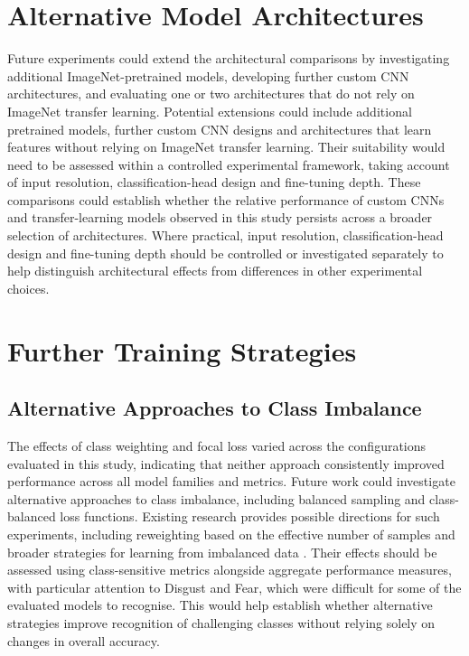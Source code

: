 \documentclass[12pt, a4paper]{report}
\let\oldsection\section
\renewcommand{\section}{%
    \Needspace{6\baselineskip}%
    \oldsection
}
\let\oldsubsection\subsection
\renewcommand{\subsection}{%
    \Needspace{6\baselineskip}%
    \oldsubsection
}
\begin{document}
		\section{Alternative Model Architectures}
			
			Future experiments could extend the architectural comparisons by investigating additional ImageNet-pretrained models, developing further custom CNN architectures, and evaluating one or two architectures that do not rely on ImageNet transfer learning. Potential extensions could include additional pretrained models, further custom CNN designs and architectures that learn features without relying on ImageNet transfer learning. Their suitability would need to be assessed within a controlled experimental framework, taking account of input resolution, classification-head design and fine-tuning depth. These comparisons could establish whether the relative performance of custom CNNs and transfer-learning models observed in this study persists across a broader selection of architectures. Where practical, input resolution, classification-head design and fine-tuning depth should be controlled or investigated separately to help distinguish architectural effects from differences in other experimental choices.
			
		\section{Further Training Strategies}
			
			\subsection{Alternative Approaches to Class Imbalance}
				
				The effects of class weighting and focal loss varied across the configurations evaluated in this study, indicating that neither approach consistently improved performance across all model families and metrics. Future work could investigate alternative approaches to class imbalance, including balanced sampling and class-balanced loss functions. Existing research provides possible directions for such experiments, including reweighting based on the effective number of samples and broader strategies for learning from imbalanced data \cite{Cui2019ClassBalanced, Johnson2019ClassImbalance, Hunafa2026FERImbalance}. Their effects should be assessed using class-sensitive metrics alongside aggregate performance measures, with particular attention to Disgust and Fear, which were difficult for some of the evaluated models to recognise. This would help establish whether alternative strategies improve recognition of challenging classes without relying solely on changes in overall accuracy.
				
\end{document}
